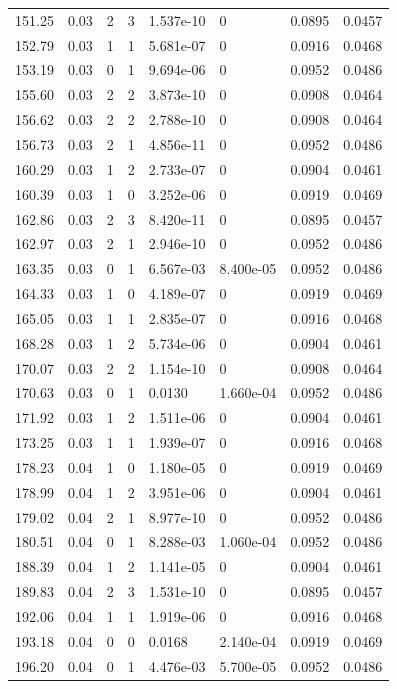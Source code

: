 \documentclass[preview]{standalone}
\begin{document}
{{{\begin{tabular}{L{1.2cm}C{1.2cm} C{0.3cm}C{0.5cm} C{1.4cm}C{1.4cm} C{1.4cm}C{1.4cm}}
  151.25  &  0.03  & 2     &  3 &  1.537e-10  & 0  & 0.0895 &  0.0457   \\ 
  152.79  &  0.03  & 1     &  1 &  5.681e-07  & 0  & 0.0916 &  0.0468   \\ 
  153.19  &  0.03  & 0     &  1 &  9.694e-06  & 0  & 0.0952 &  0.0486   \\ 
  155.60  &  0.03  & 2     &  2 &  3.873e-10  & 0  & 0.0908 &  0.0464   \\ 
  156.62  &  0.03  & 2     &  2 &  2.788e-10  & 0  & 0.0908 &  0.0464   \\ 
  156.73  &  0.03  & 2     &  1 &  4.856e-11  & 0  & 0.0952 &  0.0486   \\ 
  160.29  &  0.03  & 1     &  2 &  2.733e-07  & 0  & 0.0904 &  0.0461   \\ 
  160.39  &  0.03  & 1     &  0 &  3.252e-06  & 0  & 0.0919 &  0.0469   \\ 
  162.86  &  0.03  & 2     &  3 &  8.420e-11  & 0  & 0.0895 &  0.0457   \\ 
  162.97  &  0.03  & 2     &  1 &  2.946e-10  & 0  & 0.0952 &  0.0486   \\ 
  163.35  &  0.03  & 0     &  1 &  6.567e-03  & 8.400e-05  & 0.0952 &  0.0486   \\ 
  164.33  &  0.03  & 1     &  0 &  4.189e-07  & 0  & 0.0919 &  0.0469   \\ 
  165.05  &  0.03  & 1     &  1 &  2.835e-07  & 0  & 0.0916 &  0.0468   \\ 
  168.28  &  0.03  & 1     &  2 &  5.734e-06  & 0  & 0.0904 &  0.0461   \\ 
  170.07  &  0.03  & 2     &  2 &  1.154e-10  & 0  & 0.0908 &  0.0464   \\ 
  170.63  &  0.03  & 0     &  1 &  0.0130  & 1.660e-04  & 0.0952 &  0.0486   \\ 
  171.92  &  0.03  & 1     &  2 &  1.511e-06  & 0  & 0.0904 &  0.0461   \\ 
  173.25  &  0.03  & 1     &  1 &  1.939e-07  & 0  & 0.0916 &  0.0468   \\ 
  178.23  &  0.04  & 1     &  0 &  1.180e-05  & 0  & 0.0919 &  0.0469   \\ 
  178.99  &  0.04  & 1     &  2 &  3.951e-06  & 0  & 0.0904 &  0.0461   \\ 
  179.02  &  0.04  & 2     &  1 &  8.977e-10  & 0  & 0.0952 &  0.0486   \\ 
  180.51  &  0.04  & 0     &  1 &  8.288e-03  & 1.060e-04  & 0.0952 &  0.0486   \\ 
  188.39  &  0.04  & 1     &  2 &  1.141e-05  & 0  & 0.0904 &  0.0461   \\ 
  189.83  &  0.04  & 2     &  3 &  1.531e-10  & 0  & 0.0895 &  0.0457   \\ 
  192.06  &  0.04  & 1     &  1 &  1.919e-06  & 0  & 0.0916 &  0.0468   \\ 
  193.18  &  0.04  & 0     &  0 &  0.0168  & 2.140e-04  & 0.0919 &  0.0469   \\ 
  196.20  &  0.04  & 0     &  1 &  4.476e-03  & 5.700e-05  & 0.0952 &  0.0486   \\ 
\hline 
\end{tabular} 

}}}
\end{document}
